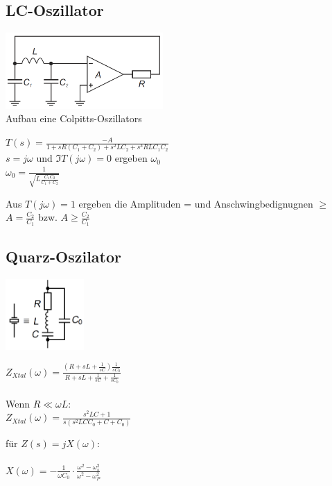 \subsection{LC-Oszillator}
	\begin{multicols}{3}
		\includegraphics[width=6cm]{bilder/osziLC.png}\\
		Aufbau eine Colpitts-Oszillators
		\columnbreak
		
		$T\left(s\right)=\frac{-A}{1+sR\left(C_1+C_2\right)+s^2LC_2+s^3RLC_1C_2}$\\
		$s=j\omega$ und $\Im{T\left(j\omega\right)}=0$ ergeben $\omega_0$\\
		$\omega_0=\frac{1}{\sqrt{L\frac{C_1 C_2}{C_1+C_2}}}$\\
		\columnbreak
		
		Aus $T\left(j\omega\right)=1$ ergeben die Amplituden = und Anschwingbedignugnen
		$\geq$
		$A=\frac{C_2}{C_1}$ bzw. $A\geq\frac{C_2}{C_1}$
	\end{multicols}
\subsection{Quarz-Oszilator}
	\begin{multicols}{3}
		\includegraphics[width=3cm]{bilder/osziCrystal.png}
		\columnbreak
		
		$Z_{Xtal}\left(\omega\right)=\frac{\left(R+sL+\frac{1}{sC}\right)\frac{1}{sC_0}}{R+sL+\frac{1}{sC}+\frac{1}{sC_0}}$\\
		\\
		Wenn $R \ll \omega L$:\\
		$Z_{Xtal}\left(\omega\right)=\frac{s^2LC+1}{s\left(s^2LCC_0+C+C_0\right)}$\\
		\columnbreak
		
		f\"ur $Z\left(s\right)=jX\left(\omega\right)$:\\
		\\
		$X\left(\omega\right)=-\frac{1}{\omega C_0}\cdot \frac{\omega^2 -
		\omega_s^2}{\omega^2-\omega^2_P}$
	\end{multicols}
